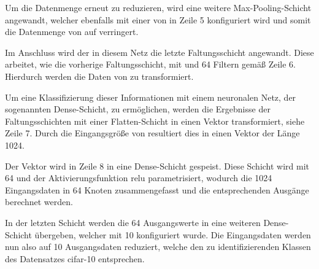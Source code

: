Um die Datenmenge erneut zu reduzieren, wird eine weitere Max-Pooling-Schicht angewandt, welcher ebenfalls mit einer  von   in Zeile 5 konfiguriert wird  und somit die Datenmenge von  auf  verringert.

Im Anschluss wird der in diesem Netz die letzte Faltungsschicht angewandt. Diese arbeitet, wie die vorherige Faltungsschicht, mit   und 64 Filtern gemäß Zeile 6. Hierdurch werden die Daten von  zu  transformiert.

Um eine Klassifizierung dieser Informationen mit einem neuronalen Netz, der sogenannten Dense-Schicht, zu ermöglichen, werden die Ergebnisse der Faltungsschichten mit einer Flatten-Schicht in einen  Vektor transformiert, siehe Zeile 7. Durch die Eingangsgröße von  resultiert dies in einen Vektor der Länge 1024.

Der Vektor wird in Zeile 8 in eine Dense-Schicht gespeist. Diese Schicht wird mit 64  und der  Aktivierungsfunktion \ac{relu} parametrisiert, wodurch die 1024 Eingangsdaten in 64 Knoten zusammengefasst und die entsprechenden Ausgänge berechnet werden.

In der letzten Schicht werden die 64 Ausgangswerte in eine weiteren Dense-Schicht übergeben, welcher mit 10  konfiguriert wurde. Die Eingangsdaten werden nun also auf 10 Ausgangsdaten reduziert, welche den zu identifizierenden Klassen des  Datensatzes \ac{cifar}-10 entsprechen.
 













